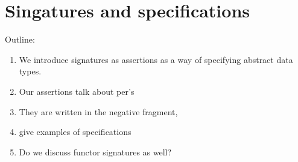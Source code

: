 \section{Singatures and specifications}
\label{sec:sing-spec}

Outline:
%
\begin{enumerate}
\item We introduce signatures as assertions as a way of specifying
  abstract data types.
\item Our assertions talk about per's
\item They are written in the negative fragment,
\item give examples of specifications
\item Do we discuss functor signatures as well?
\end{enumerate}




